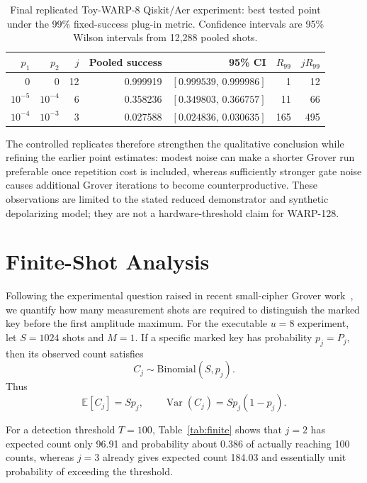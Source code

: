 \documentclass[10pt,a4paper]{article}
\newcommand{\E}{\mathbb{E}}
\begin{document}
\begin{table}[H]
\centering
\caption{Final replicated Toy-WARP-8 Qiskit/Aer experiment: best tested point under the 99\% fixed-success plug-in metric. Confidence intervals are 95\% Wilson intervals from 12,288 pooled shots.}
\label{tab:toywarp_fixed_success}
\begin{tabular}{rrrrrrr}
\toprule
$p_1$ & $p_2$ & $j$ & Pooled success & 95\% CI & $R_{99}$ & $jR_{99}$\\
\midrule
0 & 0 & 12 & 0.999919 & $[0.999539,\,0.999986]$ & 1 & 12\\
$10^{-5}$ & $10^{-4}$ & 6 & 0.358236 & $[0.349803,\,0.366757]$ & 11 & 66\\
$10^{-4}$ & $10^{-3}$ & 3 & 0.027588 & $[0.024836,\,0.030635]$ & 165 & 495\\
\bottomrule
\end{tabular}
\end{table}

The controlled replicates therefore strengthen the qualitative conclusion while refining the earlier point estimates: modest noise can make a shorter Grover run preferable once repetition cost is included, whereas sufficiently stronger gate noise causes additional Grover iterations to become counterproductive. These observations are limited to the stated reduced demonstrator and synthetic depolarizing model; they are not a hardware-threshold claim for WARP-128.


\section{Finite-Shot Analysis}

Following the experimental question raised in recent small-cipher Grover work~\cite{Kiran2026}, we quantify how many measurement shots are required to distinguish the marked key before the first amplitude maximum. For the executable $u=8$ experiment, let $S=1024$ shots and $M=1$. If a specific marked key has probability $p_j=P_j$, then its observed count satisfies
\begin{equation}
    C_j\sim\mathrm{Binomial}(S,p_j).
\end{equation}
Thus
\begin{equation}
    \E[C_j]=Sp_j,\qquad \operatorname{Var}(C_j)=Sp_j(1-p_j).
\end{equation}

For a detection threshold $T=100$, Table~\ref{tab:finite} shows that $j=2$ has expected count only 96.91 and probability about 0.386 of actually reaching 100 counts, whereas $j=3$ already gives expected count 184.03 and essentially unit probability of exceeding the threshold.
\end{document}

